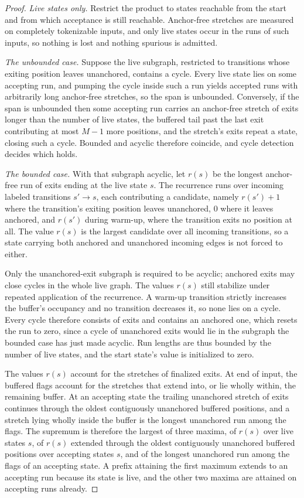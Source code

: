 \documentclass[11pt,a4paper]{article}
\theoremstyle{definition}
\theoremstyle{plain}
\begin{document}
\begin{proof}
\emph{Live states only.} Restrict the product to states reachable from the start and from which acceptance is still
reachable. Anchor-free stretches are measured on completely tokenizable inputs, and only live states occur in the runs
of such inputs, so nothing is lost and nothing spurious is admitted.

\emph{The unbounded case.} Suppose the live subgraph, restricted to transitions whose exiting position leaves
unanchored, contains a cycle. Every live state lies on some accepting run, and pumping the cycle inside such a run
yields accepted runs with arbitrarily long anchor-free stretches, so the span is unbounded. Conversely, if the span is
unbounded then some accepting run carries an anchor-free stretch of exits longer than the number of live states, the
buffered tail past the last exit contributing at most $M - 1$ more positions, and the stretch's exits repeat a state,
closing such a cycle. Bounded and acyclic therefore coincide, and cycle detection decides which holds.

\emph{The bounded case.} With that subgraph acyclic, let $r(s)$ be the longest anchor-free run of exits ending at the
live state $s$. The recurrence runs over incoming labeled transitions $s' \to s$, each contributing a candidate, namely
$r(s') + 1$ where the transition's exiting position leaves unanchored, $0$ where it leaves anchored, and $r(s')$ during
warm-up, where the transition exits no position at all. The value $r(s)$ is the largest candidate over all incoming
transitions, so a state carrying both anchored and unanchored incoming edges is not forced to either.

Only the unanchored-exit subgraph is required to be acyclic; anchored exits may close cycles in the whole live graph.
The values $r(s)$ still stabilize under repeated application of the recurrence. A warm-up transition strictly increases
the buffer's occupancy and no transition decreases it, so none lies on a cycle. Every cycle therefore consists of exits
and contains an anchored one, which resets the run to zero, since a cycle of unanchored exits would lie in the subgraph
the bounded case has just made acyclic. Run lengths are thus bounded by the number of live states, and the start state's
value is initialized to zero.

The values $r(s)$ account for the stretches of finalized exits. At end of input, the buffered flags account for the
stretches that extend into, or lie wholly within, the remaining buffer. At an accepting state the trailing unanchored
stretch of exits continues through the oldest contiguously unanchored buffered positions, and a stretch lying wholly
inside the buffer is the longest unanchored run among the flags. The supremum is therefore the largest of three maxima,
of $r(s)$ over live states $s$, of $r(s)$ extended through the oldest contiguously unanchored buffered positions over
accepting states $s$, and of the longest unanchored run among the flags of an accepting state. A prefix attaining the
first maximum extends to an accepting run because its state is live, and the other two maxima are attained on accepting
runs already.
\end{proof}
\end{document}
